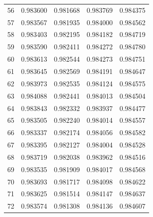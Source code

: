\begin{table}
\begin{tabular}{rrrrr}
56 & 0.983600 & 0.981668 & 0.983769 & 0.984375 \\
57 & 0.983567 & 0.981935 & 0.984000 & 0.984562 \\
58 & 0.983403 & 0.982195 & 0.984182 & 0.984719 \\
59 & 0.983590 & 0.982411 & 0.984272 & 0.984780 \\
60 & 0.983613 & 0.982544 & 0.984273 & 0.984751 \\
61 & 0.983645 & 0.982569 & 0.984191 & 0.984647 \\
62 & 0.983973 & 0.982535 & 0.984124 & 0.984575 \\
63 & 0.984088 & 0.982441 & 0.984013 & 0.984504 \\
64 & 0.983843 & 0.982332 & 0.983937 & 0.984477 \\
65 & 0.983505 & 0.982240 & 0.984014 & 0.984557 \\
66 & 0.983337 & 0.982174 & 0.984056 & 0.984582 \\
67 & 0.983395 & 0.982127 & 0.984004 & 0.984528 \\
68 & 0.983719 & 0.982038 & 0.983962 & 0.984516 \\
69 & 0.983535 & 0.981909 & 0.984017 & 0.984568 \\
70 & 0.983693 & 0.981717 & 0.984098 & 0.984622 \\
71 & 0.983625 & 0.981514 & 0.984147 & 0.984637 \\
72 & 0.983574 & 0.981308 & 0.984136 & 0.984607 \\
\bottomrule
\end{tabular}
\end{table}
